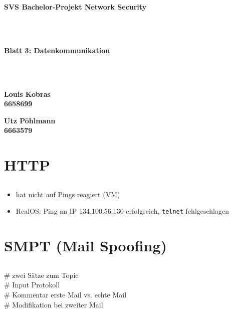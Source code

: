 \documentclass[twoside]{article}
\newcommand{\ttt}[1]{%
	\texttt{#1}%
}
\begin{document}
\pagestyle{fancy}
\fancyhead{}
\fancyfoot{}

\begin{center}
\begin{Huge}
\textbf{SVS Bachelor-Projekt Network Security}
\end{Huge}\\\-\\
\begin{Large}
\textbf{Blatt 3: Datenkommunikation}
\end{Large}\\\-\\
\begin{minipage}[t]{0.48\textwidth}
\begin{center}\textbf{
	Louis Kobras\\
	6658699}
\end{center}
\end{minipage}
\begin{minipage}[t]{0.48\textwidth}
\begin{center}\textbf{
	Utz Pöhlmann\\
	6663579}
\end{center}
\end{minipage}
\end{center}

\section{HTTP}
\subsection{}
\begin{itemize}
	\item hat nicht auf Pings reagiert (VM)
	\item RealOS: Ping an IP 134.100.56.130 erfolgreich, \ttt{telnet} fehlgeschlagen
\end{itemize}



\section{SMPT (Mail Spoofing)}
\subsection{}
\# zwei Sätze zum Topic\\
\# Input Protokoll\\
\# Kommentar erste Mail vs. echte Mail\\
\# Modifikation bei zweiter Mail
\end{document}
